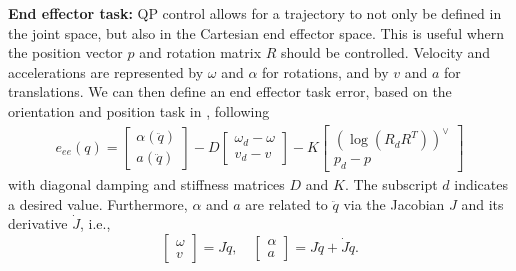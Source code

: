 \documentclass[a4paper, 10pt, conference]{ieeeconf}
\begin{document}
    \textbf{End effector task:}
    QP control allows for a trajectory to not only be defined in the joint space, but also in the Cartesian end effector space. This is useful whern the position vector $p$ and rotation matrix $R$ should be controlled. Velocity and accelerations are represented by $\omega$ and $\alpha$ for rotations, and by $v$ and $a$ for translations. We can then define an end effector task error, based on the orientation and position task in \cite{cisnerosRobustHumanoidControl2018}, following 
      \begin{align} \label{eq:eetask} e_{ee}(q) = 
    \begin{bmatrix} \alpha(\ddot{q}) \\ a(\ddot{q}) \end{bmatrix}
    - D \begin{bmatrix} \omega_d - {\omega} \\ v_d - v \end{bmatrix}  - K \begin{bmatrix}(\log({R}_dR^T))^{\vee }  \\p_d - {p}  \end{bmatrix}
        \end{align} with diagonal damping and stiffness matrices $D$ and $K$. The subscript $d$ indicates a desired value. Furthermore, $\alpha$ and $a$ are related to $\ddot{q}$ via the Jacobian $J$ and its derivative $\dot{J}$, i.e.,
    \begin{equation}\label{eq:jacobian}
    \begin{bmatrix} \omega \\ v \end{bmatrix}=J\dot{q},
    \quad 
    \begin{bmatrix} \alpha \\ a \end{bmatrix}=J\ddot{q}+\dot{J}\dot{q}.
    \end{equation}
\end{document}

